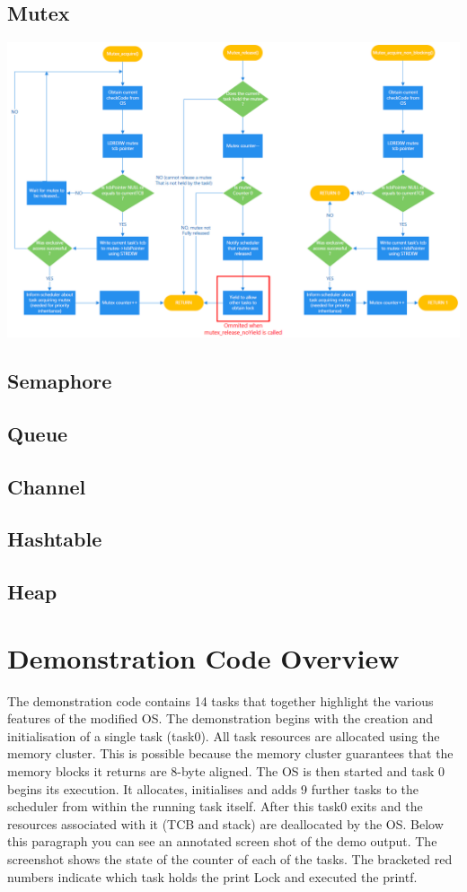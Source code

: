 \documentclass[12pt,a4paper]{article}
\begin{document}
\subsection{Mutex}
\includegraphics[width=1\textwidth]{images/Mutex.png}\\
\subsection{Semaphore}
\subsection{Queue}
\subsection{Channel}
\subsection{Hashtable}
\subsection{Heap}

\pagebreak
\section{Demonstration Code Overview}
The demonstration code contains 14 tasks that together highlight the various features of the modified OS. The demonstration begins with the creation and initialisation of a single task (task0). All task resources are allocated using the memory cluster. This is possible because the memory cluster guarantees that the memory blocks it returns are 8-byte aligned. The OS is then started and task 0 begins its execution. It allocates, initialises and adds 9 further tasks to the scheduler from within the running task itself. After this task0 exits and the resources associated with it (TCB and stack) are deallocated by the OS. Below this paragraph you can see an annotated screen shot of the demo output. The screenshot shows the state of the counter of each of the tasks. The bracketed red numbers indicate which task holds the print Lock and executed the printf.\\
\end{document}
